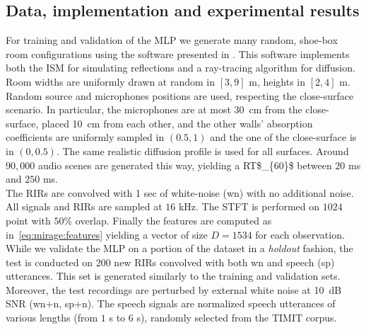 \subsection{Data, implementation and experimental results}\label{subsec:lantern:simple:mpl:results}
For training and validation of the \ac{MLP} we generate many random, shoe-box room configurations using the software presented in .
This software implements both the \acf{ISM} for simulating reflections and a ray-tracing algorithm for diffusion.
Room widths are uniformly drawn at random in $[3, 9]$ m, heights in $[2, 4]$ m.
Random source and microphones positions are used, respecting the close-surface scenario.
In particular, the microphones are at most 30~cm from the close-surface, placed 10~cm from each other, and the other walls' absorption coefficients are uniformly sampled in $(0.5, 1)$ and the one of the close-surface is in $(0, 0.5)$.
The same realistic diffusion profile  is used for all surfaces.
Around $90,000$ audio scenes are generated this way, yielding a \ac{RT$_{60}$} between $20$ ms and $250$ ms.
\\The \acp{RIR} are convolved with 1 sec of white-noise (wn) with no additional noise.
All signals and \acp{RIR} are sampled at $16$ kHz.
The \ac{STFT} is performed on $1024$ point with $50\%$ overlap.
Finally the features are computed as in~\eqref{eq:mirage:features} yielding a vector of size $D = 1534$ for each observation.
\\While we validate the \ac{MLP} on a portion of the dataset in a \textit{holdout} fashion, the test is conducted on 200 new \acp{RIR} convolved with both wn and speech (sp) utterances.
This set is generated similarly to the training and validation sets.
Moreover, the test recordings are perturbed by external white noise at 10~dB \acf{SNR} (wn+n, sp+n).
The speech signals are normalized speech utterances of various lengths (from $1$ s to $6$ s), randomly selected from the TIMIT corpus.

